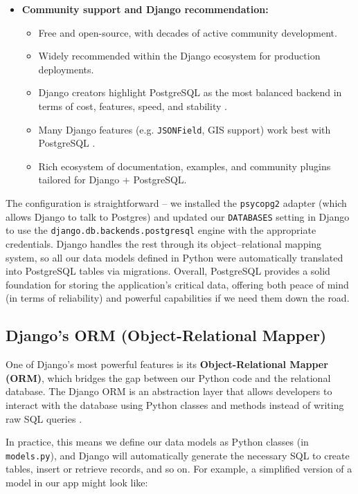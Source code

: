 \begin{itemize}
	\item \textbf{Community support and Django recommendation:} 
	\begin{itemize}
		\item Free and open-source, with decades of active community development. 
		\item Widely recommended within the Django ecosystem for production deployments. 
		\item Django creators highlight PostgreSQL as the most balanced backend in terms of cost, features, speed, and stability \parencite{DjangoDatabases,DjangoPostgresFields}. 
		\item Many Django features (e.g. \texttt{JSONField}, GIS support) work best with PostgreSQL \parencite{DjangoPostgresFields}. 
		\item Rich ecosystem of documentation, examples, and community plugins tailored for Django + PostgreSQL. 
	\end{itemize}
\end{itemize} 

The configuration is straightforward – we installed the \texttt{psycopg2} adapter (which allows Django to talk to Postgres) and updated our \texttt{DATABASES} setting in Django to use the \texttt{django.\allowbreak db.\allowbreak backends.\allowbreak postgresql} engine with the appropriate credentials. Django handles the rest through its object–relational mapping system, so all our data models defined in Python were automatically translated into PostgreSQL tables via migrations. Overall, PostgreSQL provides a solid foundation for storing the application’s critical data, offering both peace of mind (in terms of reliability) and powerful capabilities if we need them down the road.

\subsection{Django’s ORM (Object-Relational Mapper)} 

One of Django’s most powerful features is its 
\textbf{Object-Relational Mapper (ORM)}, which bridges the gap between our 
Python code and the relational database. The Django ORM is an abstraction 
layer that allows developers to interact with the database using Python 
classes and methods instead of writing raw SQL queries \parencite{DjangoORMQueries}. 

In practice, this means we define our data models as Python classes (in 
\texttt{models.py}), and Django will automatically generate the necessary SQL 
to create tables, insert or retrieve records, and so on. For example, a 
simplified version of a model in our app might look like: 

